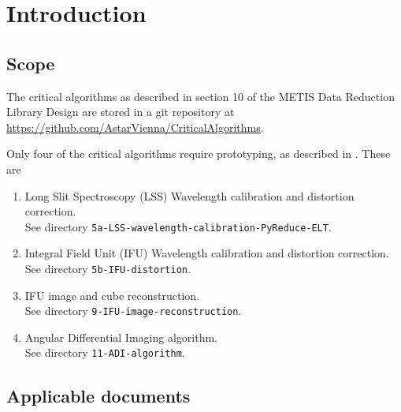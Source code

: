 \documentclass[11pt,oneside,a4paper]{article}
\newcommand{\CODE}[1]{\lstinline[]!#1!}
\begin{document}




\section{Introduction}
\label{sec:intro}

\subsection{Scope}
The critical algorithms as described in section 10 of the METIS Data Reduction Library Design \cite{DRLD} are stored in a git repository at \url{https://github.com/AstarVienna/CriticalAlgorithms}.

Only four of the critical algorithms require prototyping, as described in \cite{DRLD}.
These are
\begin{enumerate}
    \item[5a.] Long Slit Spectroscopy (LSS) Wavelength calibration and distortion correction.\\
        See directory \CODE{5a-LSS-wavelength-calibration-PyReduce-ELT}.
    \item[5b.] Integral Field Unit (IFU) Wavelength calibration and distortion correction.\\
        See directory \CODE{5b-IFU-distortion}.
    \item[9.] IFU image and cube reconstruction.\\
        See directory \CODE{9-IFU-image-reconstruction}.
    \item[11.] Angular Differential Imaging algorithm.\\
        See directory \CODE{11-ADI-algorithm}.
\end{enumerate}

\subsection{Applicable documents}
\begin{refcontext}[labelprefix=AD]
  \printbibliography[keyword=applicable, heading=none]
\end{refcontext}




%

\clearpage
\end{document}
